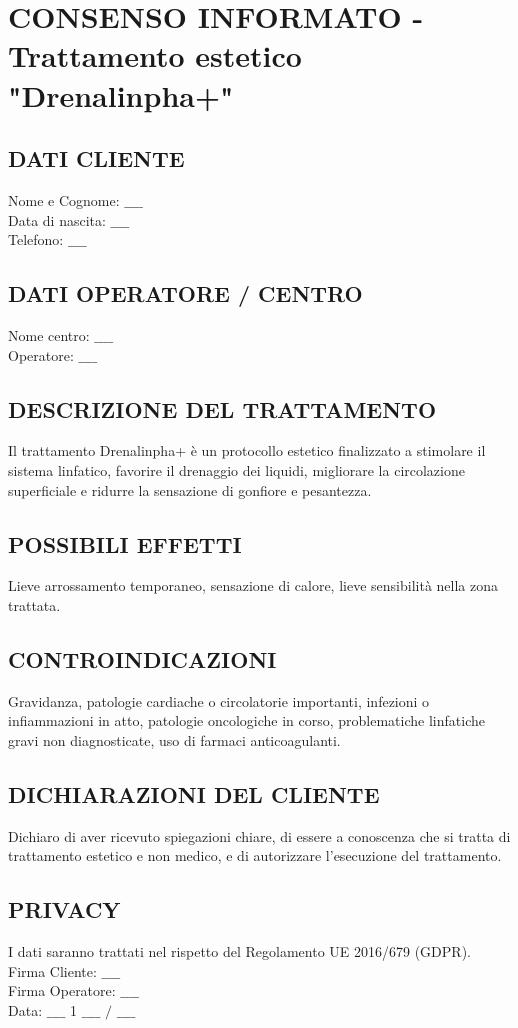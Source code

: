 \section{CONSENSO INFORMATO - Trattamento estetico "Drenalinpha+"}
\subsection{DATI CLIENTE}
Nome e Cognome: $\_\_\_\_$\\
Data di nascita: $\_\_\_\_$\\
Telefono: $\_\_\_\_$

\subsection{DATI OPERATORE / CENTRO}
Nome centro: $\_\_\_\_$\\
Operatore: $\_\_\_\_$

\subsection{DESCRIZIONE DEL TRATTAMENTO}
Il trattamento Drenalinpha+ è un protocollo estetico finalizzato a stimolare il sistema linfatico, favorire il drenaggio dei liquidi, migliorare la circolazione superficiale e ridurre la sensazione di gonfiore e pesantezza.

\subsection{POSSIBILI EFFETTI}
Lieve arrossamento temporaneo, sensazione di calore, lieve sensibilità nella zona trattata.

\subsection{CONTROINDICAZIONI}
Gravidanza, patologie cardiache o circolatorie importanti, infezioni o infiammazioni in atto, patologie oncologiche in corso, problematiche linfatiche gravi non diagnosticate, uso di farmaci anticoagulanti.

\subsection{DICHIARAZIONI DEL CLIENTE}
Dichiaro di aver ricevuto spiegazioni chiare, di essere a conoscenza che si tratta di trattamento estetico e non medico, e di autorizzare l'esecuzione del trattamento.

\subsection{PRIVACY}
I dati saranno trattati nel rispetto del Regolamento UE 2016/679 (GDPR).\\
Firma Cliente: $\_\_\_\_$\\
Firma Operatore: $\_\_\_\_$\\
Data: $\_\_\_\_$ 1 $\_\_\_\_$ $/$ $\_\_\_\_$